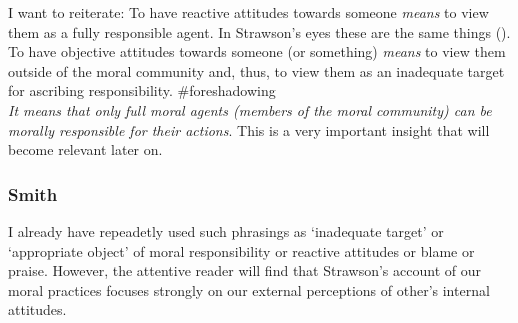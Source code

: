 \documentclass{article}
\begin{document}
I want to reiterate: To have reactive attitudes towards someone \textit{means}
to view them as a fully responsible agent. In Strawson's eyes these are the same
things (\cite[p.23]{Strawson1962}). To have objective attitudes towards someone (or something)
\textit{means} to view them outside of the moral community and, thus, to view
them as an inadequate target for ascribing responsibility. \#foreshadowing\\
\textit{It means that only full moral agents (members of the moral community) can be
morally responsible for their actions}.  This is a very important insight that
will become relevant later on.
\label{responsibility_implies_agency}



\subsubsection{Smith}
\label{smith}

I already have repeadetly used such phrasings as `inadequate target' or
`appropriate object' of moral responsibility or reactive attitudes or blame or
praise. However, the attentive reader will find that Strawson's account of our
moral practices focuses strongly on our external perceptions of other's
internal attitudes.
\end{document}
